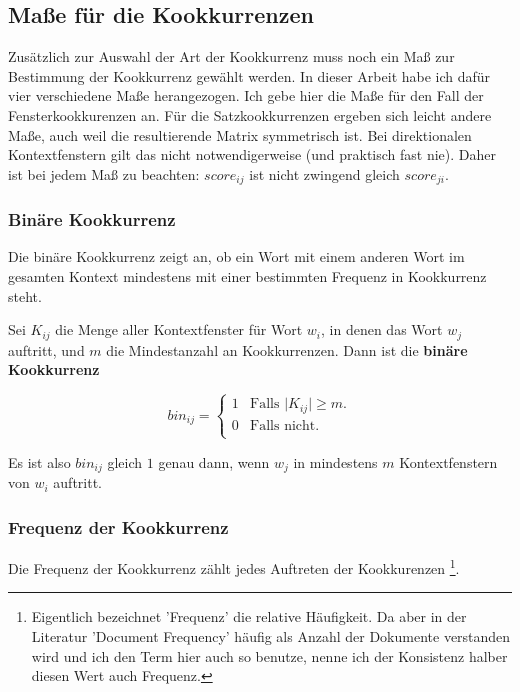 \documentclass[11pt,numbers=noenddot]{scrartcl}
\begin{document}
\subsection{Maße für die Kookkurrenzen} \label{coocmeasures}

Zusätzlich zur Auswahl der Art der Kookkurrenz muss noch ein Maß zur Bestimmung der Kookkurrenz gewählt werden. In dieser Arbeit habe ich dafür vier verschiedene Maße herangezogen. Ich gebe hier die Maße für den Fall der Fensterkookkurenzen an. Für die Satzkookkurrenzen ergeben sich leicht andere Maße, auch weil die resultierende Matrix symmetrisch ist. Bei direktionalen Kontextfenstern gilt das nicht notwendigerweise (und praktisch fast nie). Daher ist bei jedem Maß zu beachten: $score_{ij}$ ist nicht zwingend gleich $score_{ji}$.

\subsubsection{Binäre Kookkurrenz} \label{bin}

Die binäre Kookkurrenz zeigt an, ob ein Wort mit einem anderen Wort im gesamten Kontext mindestens mit einer bestimmten Frequenz in Kookkurrenz steht.

Sei $K_{ij}$ die Menge aller Kontextfenster für Wort $w_i$, in denen das Wort $w_j$ auftritt, und $m$ die Mindestanzahl an Kookkurrenzen. Dann ist die \textbf{binäre Kookkurrenz}

\begin{equation*}
   bin_{ij} =
   \begin{cases}
        1 & \text{Falls |$K_{ij}| \ge m$.}\\
        0 & \text{Falls nicht.}\\
   \end{cases}
\end{equation*}

Es ist also $bin_{ij}$ gleich $1$ genau dann, wenn $w_j$ in mindestens $m$ Kontextfenstern von $w_i$ auftritt.

\subsubsection{Frequenz der Kookkurrenz} \label{freq}

Die Frequenz der Kookkurrenz zählt jedes Auftreten der Kookkurenzen \footnote{Eigentlich bezeichnet  'Frequenz' die relative Häufigkeit. Da aber in der Literatur 'Document Frequency' häufig als Anzahl der Dokumente verstanden wird und ich den Term hier auch so benutze, nenne ich der Konsistenz halber diesen Wert auch Frequenz. }.
\end{document}
